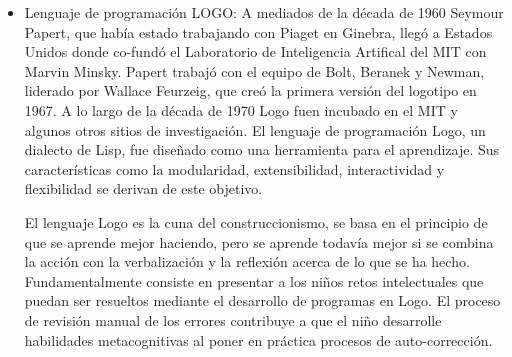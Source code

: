 \begin{itemize}

\item Lenguaje de programación LOGO: A mediados de la década de 1960 Seymour
	Papert, que había estado trabajando con Piaget en Ginebra, llegó a
	Estados Unidos donde co-fundó el Laboratorio de Inteligencia Artifical
	del MIT con Marvin Minsky. Papert trabajó con el equipo de Bolt, Beranek
	y Newman, liderado por Wallace Feurzeig, que creó la primera versión del
	logotipo en 1967. A lo largo de la década de 1970 Logo fuen incubado en
	el MIT y algunos otros sitios de investigación. El lenguaje de
	programación Logo, un dialecto de Lisp, fue diseñado como una
	herramienta para el aprendizaje. Sus características como la
	modularidad, extensibilidad, interactividad y flexibilidad se derivan de
	este objetivo. 

	El lenguaje Logo es la cuna del construccionismo, se basa en el
	principio de que se aprende mejor haciendo, pero se aprende todavía
	mejor si se combina la acción con la verbalización  y la reflexión
	acerca de lo que se ha hecho. Fundamentalmente consiste en presentar a
	los niños retos intelectuales que puedan ser resueltos mediante el
	desarrollo de programas en Logo. El proceso de revisión manual de los
	errores contribuye a que el niño desarrolle habilidades metacognitivas
	al poner en práctica procesos de auto-corrección\cite{logo:sg}.






\end{itemize}

